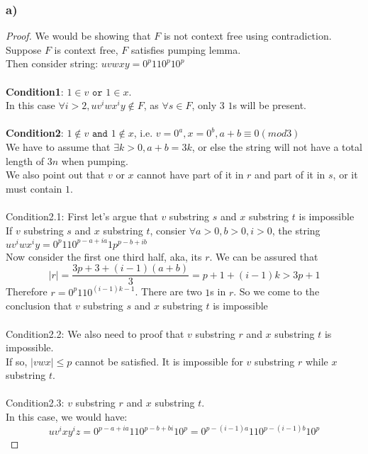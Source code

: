 \documentclass{article}
\begin{document}
\subsubsection{a)}
	\begin{proof}
		We would be showing that $F$ is not context free using contradiction. \\
		Suppose $F$ is context free, $F$ satisfies pumping lemma. \\
		Then consider string: $uvwxy = 0^{p}110^{p}10^{p}$ \\
		\\
		\textbf{Condition1}: 
			$1 \in v \texttt{ or } 1 \in x$. \\
			In this case $\forall i > 2, uv^iwx^iy \notin F$, as $\forall s \in F$, only 3 $1$s will be present. \\
		\\
		\textbf{Condition2}: 
			$1 \notin v \texttt{ and } 1 \notin x$, i.e. $v = 0^a, x = 0^b, a+b \equiv 0 (mod 3)$ \\
			We have to assume that $\exists k > 0, a+b = 3k$, or else the string will not have a total length of $3n$ when pumping. \\	
			We also point out that $v$ or $x$ cannot have part of it in $r$ and part of it in $s$, or it must contain $1$. \\
			\\
			Condition2.1: First let's argue that $v$ substring $s$ and $x$ substring $t$ is impossible\\
				If $v$ substring $s$ and $x$ substring $t$, consier $\forall a > 0, b>0, i>0$, the string $uv^iwx^iy = 0^p110^{p-a+ia}1p^{p-b+ib}$ \\
				Now consider the first one third half, aka, its $r$. We can be assured that $$|r| = \frac{3p + 3 + (i-1)(a+b)}{3} = p+1+(i-1)k > 3p+1$$
				Therefore $r = 0^p110^{(i-1)k-1}$. There are two $1$s in $r$.
				So we come to the conclusion that $v$ substring $s$ and $x$ substring $t$ is impossible \\ 
			\\
			Condition2.2: We also need to proof that $v$ substring $r$ and $x$ substring $t$ is impossible. \\
			If so, $|vwx| \le p$ cannot be satisfied. It is impossible for $v$ substring $r$ while $x$ substring $t$.\\
			\\
			Condition2.3: 
				$v$ substring $r$ and $x$ substring $t$. \\
				In this case, we would have: 
				$$uv^ixy^iz = 0^{p-a+ia}110^{p-b+bi}10^{p} = 0^{p-(i-1)a}110^{p-(i-1)b}10^{p}$$

\end{proof}
\end{document}
